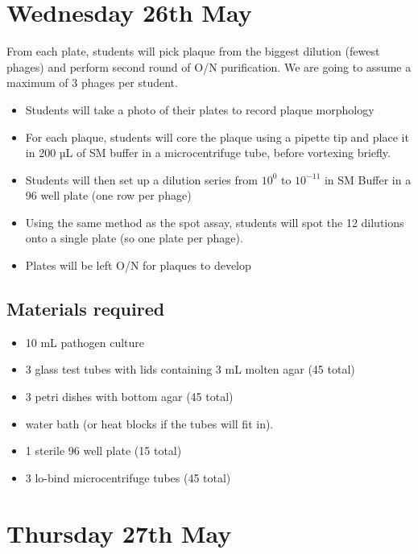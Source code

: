 \documentclass[
]{book}
\providecommand{\tightlist}{%
  \setlength{\itemsep}{0pt}\setlength{\parskip}{0pt}}
\begin{document}
\hypertarget{wednesday-26th-may}{%
\section{Wednesday 26th May}\label{wednesday-26th-may}}

From each plate, students will pick plaque from the biggest dilution (fewest phages) and perform second round of O/N purification. We are going to assume a maximum of 3 phages per student.

\begin{itemize}
\tightlist
\item
  Students will take a photo of their plates to record plaque morphology
\item
  For each plaque, students will core the plaque using a pipette tip and place it in 200 µL of SM buffer in a microcentrifuge tube, before vortexing briefly.
\item
  Students will then set up a dilution series from \(10^{0}\) to \(10^{-11}\) in SM Buffer in a 96 well plate (one row per phage)
\item
  Using the same method as the spot assay, students will spot the 12 dilutions onto a single plate (so one plate per phage).
\item
  Plates will be left O/N for plaques to develop
\end{itemize}

\hypertarget{materials-required-7}{%
\subsection{Materials required}\label{materials-required-7}}

\begin{itemize}
\tightlist
\item
  10 mL pathogen culture
\item
  3 glass test tubes with lids containing 3 mL molten agar (45 total)
\item
  3 petri dishes with bottom agar (45 total)
\item
  water bath (or heat blocks if the tubes will fit in).
\item
  1 sterile 96 well plate (15 total)
\item
  3 lo-bind microcentrifuge tubes (45 total)
\end{itemize}

\hypertarget{thursday-27th-may}{%
\section{Thursday 27th May}\label{thursday-27th-may}}
\end{document}
